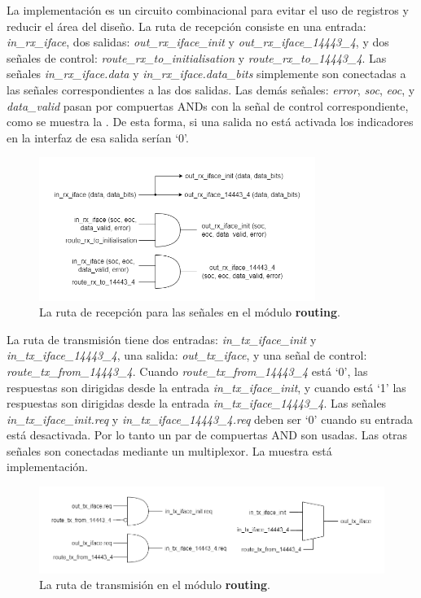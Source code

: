 \documentclass[a4paper, twoside, 11pt]{report}
\begin{document}
La implementación es un circuito combinacional para evitar el uso de registros y reducir el área del diseño. La ruta de recepción consiste en una entrada: \textit{in\_rx\_iface}, dos salidas: \textit{out\_rx\_iface\_init} y \textit{out\_rx\_iface\_14443\_4}, y dos señales de control: \textit{route\_rx\_to\_initialisation} y \textit{route\_rx\_to\_14443\_4}. Las señales \textit{in\_rx\_iface.data} y \textit{in\_rx\_iface.data\_bits} simplemente son conectadas a las señales correspondientes a las dos salidas. Las demás señales: \textit{error}, \textit{soc}, \textit{eoc}, y \textit{data\_valid} pasan por compuertas ANDs con la señal de control correspondiente, como se muestra la . De esta forma, si una salida no está activada los indicadores en la interfaz de esa salida serían ‘0’.

\begin{figure}[htb]
  \centering
  \includegraphics[width=0.8\textwidth]{./img/routing_rx.drawio}
  \caption{La ruta de recepción para las señales en el módulo \textbf{routing}.}
  \label{fig:routing_rx}
\end{figure}

La ruta de transmisión tiene dos entradas: \textit{in\_tx\_iface\_init} y \textit{in\_tx\_iface\_14443\_4}, una salida: \textit{out\_tx\_iface}, y una señal de control: \textit{route\_tx\_from\_14443\_4}. Cuando \textit{route\_tx\_from\_14443\_4} está ‘0’, las respuestas son dirigidas desde la entrada \textit{in\_tx\_iface\_init}, y cuando está ‘1’ las respuestas son dirigidas desde la entrada \textit{in\_tx\_iface\_14443\_4}. Las señales \textit{in\_tx\_iface\_init.req} y \textit{in\_tx\_iface\_14443\_4.req} deben ser ‘0’ cuando su entrada está desactivada. Por lo tanto un par de compuertas AND son usadas. Las otras señales son conectadas mediante un multiplexor. La  muestra está implementación.

\begin{figure}[htb]
  \centering
  \includegraphics[width=1.0\textwidth]{./img/routing_tx.drawio}
  \caption{La ruta de transmisión en el módulo \textbf{routing}.}
  \label{fig:routing_tx}
\end{figure}
\end{document}
